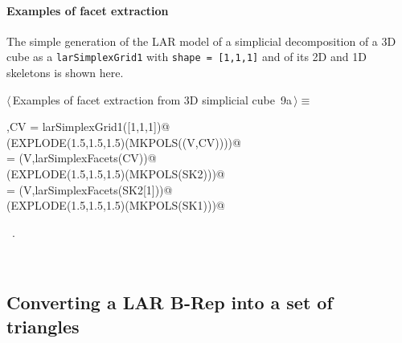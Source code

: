 \documentclass[11pt,oneside]{article}	%
\begin{document}
\paragraph{Examples of facet extraction}
The simple generation of the LAR model of a simplicial decomposition of a 3D cube as a \texttt{larSimplexGrid1} with \texttt{shape = [1,1,1]} and of its 2D and 1D skeletons is shown here.

\begin{flushleft} \small
\begin{minipage}{\linewidth} \label{scrap9}
\protect{}$\langle\,$Examples of facet extraction from 3D simplicial cube\nobreak\ {\footnotesize 9a}$\,\rangle\equiv$
\vspace{-1ex}
\begin{list}{}{} \item
\mbox{}\verb@V,CV = larSimplexGrid1([1,1,1])@\\
\mbox{}\verb@VIEW(EXPLODE(1.5,1.5,1.5)(MKPOLS((V,CV))))@\\
\mbox{} = (V,larSimplexFacets(CV))@\\
\mbox{}\verb@VIEW(EXPLODE(1.5,1.5,1.5)(MKPOLS(SK2)))@\\
\mbox{} = (V,larSimplexFacets(SK2[1]))@\\
\mbox{}\verb@VIEW(EXPLODE(1.5,1.5,1.5)(MKPOLS(SK1)))@\\
\mbox{}\verb@@{\NWsep}
\end{list}
\vspace{-1ex}
\footnotesize\addtolength{\baselineskip}{-1ex}
\begin{list}{}{\setlength{\itemsep}{-\parsep}\setlength{\itemindent}{-\leftmargin}}
\item \NWtxtMacroRefIn\ .
\end{list}
\end{minipage}\\[4ex]
\end{flushleft}



\subsection{Converting a LAR B-Rep into a set of triangles}
\end{document}
